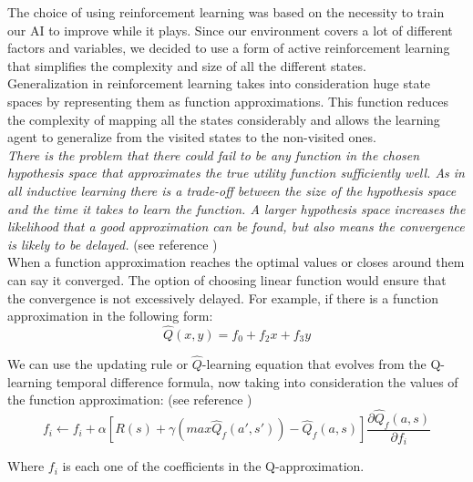 The choice of using reinforcement learning was based on the necessity to train our AI to improve while it plays. Since our environment covers a lot of different factors and variables, we decided to use a form of active reinforcement learning that simplifies the complexity and size of all the different states. \\

Generalization in reinforcement learning takes into consideration huge state spaces by representing them as function approximations. This function reduces the complexity of mapping all the states considerably and allows the learning agent to generalize from the visited states to the non-visited ones.\\

\textit{There is the problem that there could fail to be any function in the chosen hypothesis space that approximates the true utility function sufficiently well. As in all inductive learning there is a trade-off between the size of the hypothesis space and the time it takes to learn the function. A larger hypothesis space increases the likelihood that a good approximation can be found, but also means the convergence is likely to be delayed.} (see reference \cite[p778]{rl})\\

When a function approximation reaches the optimal values or closes around them can say it converged. The option of choosing linear function would ensure that the convergence is not excessively delayed. For example, if there is a function approximation in the following form:\\

\begin{equation}
\hat{Q}(x,y) = f_0 + f_2 x + f_3 y
\end{equation}

We can use the updating rule or $\hat{Q}$-learning equation that evolves from the Q-learning temporal difference formula, now taking into consideration the values of the function approximation:   (see reference \cite{rl}) \\ 
 
\begin{equation}
f_i \leftarrow f_i + \alpha [ R(s) + \gamma(max\hat{Q}_f(a',s'))-\hat{Q}_f(a,s) ] \frac{\partial \hat{Q}_f(a,s)}{\partial f_i}
\end{equation}

\begin{flushleft}
Where $f_i$ is each one of the coefficients in the Q-approximation.
\end{flushleft} 


